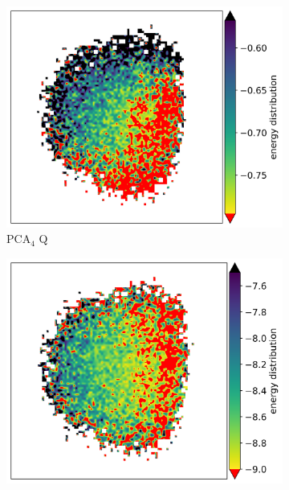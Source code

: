 \documentclass{article} %
\begin{document}
\begin{figure}[ht]
    \begin{subfigure}{0.14\textwidth}
        \centering
        \includegraphics[width=\textwidth]{images/vqe-model-circuits_4_qubits_gsqas_full_embedding_full_embedding_smooth.png}
        \caption{PCA$_4$ Q}
        \label{fig:Prev PCA-4 QC}
    \end{subfigure}
    \begin{subfigure}{0.14\textwidth}
        \centering
        \includegraphics[width=\textwidth]{images/maxcut-model-circuits_4_qubits_gsqas_full_embedding_full_embedding_smooth.png}

\end{subfigure}
\end{figure}
\end{document}
